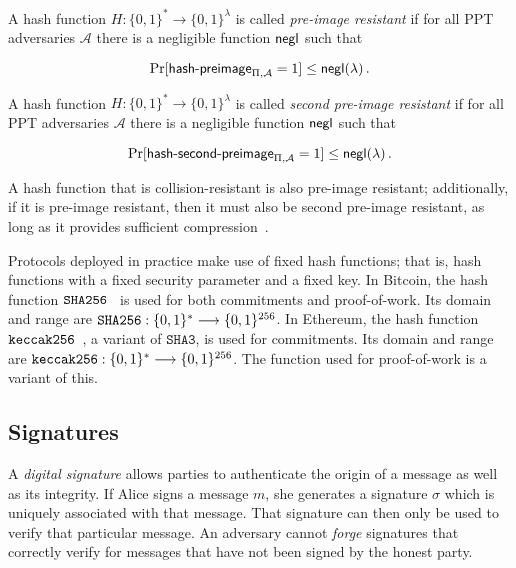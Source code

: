 


\begin{definition}
  A hash function $H: \{0, 1\}^* \longrightarrow \{0, 1\}^\lambda$ is called
  \emph{pre-image resistant} if for all PPT adversaries $\mathcal{A}$ there is a
  negligible function $\mathsf{negl}$ such that

  \[
  \Pr[\textsf{hash-preimage}_{\Pi,\mathcal{A}} = 1] \leq \mathsf{negl}(\lambda)\,.
  \]
\end{definition}

\begin{definition}
  A hash function $H: \{0, 1\}^* \longrightarrow \{0, 1\}^\lambda$ is called
  \emph{second pre-image resistant} if for all PPT adversaries $\mathcal{A}$
  there is a negligible function $\mathsf{negl}$ such that

  \[
  \Pr[\textsf{hash-second-preimage}_{\Pi,\mathcal{A}} = 1] \leq \mathsf{negl}(\lambda)\,.
  \]
\end{definition}

A hash function that is collision-resistant is also pre-image resistant; additionally, if it is pre-image resistant, then it must also be second pre-image resistant, as long as it provides sufficient compression~\cite{rogaway2004cryptographic}.

Protocols deployed in practice make use of fixed hash functions; that is, hash
functions with a fixed security parameter and a fixed key. In Bitcoin, the hash
function $\mathtt{SHA256}$~\cite{sha256} is used for both commitments and proof-of-work.
Its domain and range are
$\mathtt{SHA256}: \{0, 1\}^* \longrightarrow \{0, 1\}^{256}$. In Ethereum, the hash
function $\mathtt{keccak256}$~\cite{bertoni2008indifferentiability}, a variant of
$\texttt{SHA3}$, is used for commitments. Its domain and range are $\mathtt{keccak256}: \{0, 1\}^*
\longrightarrow \{0, 1\}^{256}$. The function used for proof-of-work is a
variant of this.

\subsection{Signatures}
A \emph{digital signature} allows parties to authenticate the origin of a
message as well as its integrity. If Alice signs a message $m$, she generates a
signature $\sigma$ which is uniquely associated with that message. That
signature can then only be used to verify that particular message. An adversary
cannot \emph{forge} signatures that correctly verify for messages that have not
been signed by the honest party.

